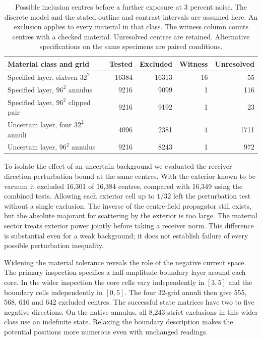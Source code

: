\begin{table}[tb]\centering
\caption{Possible inclusion centres before a further exposure at 3 percent noise. The discrete model and the stated outline and contrast intervals are assumed here. An exclusion applies to every material in that class. The witness column counts centres with a checked material. Unresolved centres are retained. Alternative specifications on the same specimens are paired conditions.}\label{tab:cover}
\small\begin{tabular}{@{}lrrrr@{}}\toprule
Material class and grid & Tested & Excluded & Witness & Unresolved\\\midrule
Specified layer, sixteen $32^2$ & 16384 & 16313 & 16 & 55\\
Specified layer, $96^2$ annulus & 9216 & 9099 & 1 & 116\\
Specified layer, $96^2$ clipped pair & 9216 & 9192 & 1 & 23\\
Uncertain layer, four $32^2$ annuli & 4096 & 2381 & 4 & 1711\\
Uncertain layer, $96^2$ annulus & 9216 & 8243 & 1 & 972\\\bottomrule
\end{tabular}\end{table}

To isolate the effect of an uncertain background we evaluated the receiver-direction perturbation bound at the same centres. With the exterior known to be vacuum it excluded 16,301 of 16,384 centres, compared with 16,349 using the combined tests. Allowing each exterior cell up to $1/32$ left the perturbation test without a single exclusion. The inverse of the centre-field propagator still exists, but the absolute majorant for scattering by the exterior is too large. The material sector treats exterior power jointly before taking a receiver norm. This difference is substantial even for a weak background; it does not establish failure of every possible perturbation inequality.

Widening the material tolerance reveals the role of the negative current space. The primary inspection specifies a half-amplitude boundary layer around each core. In the wider inspection the core cells vary independently in $[3,5]$ and the boundary cells independently in $[0,5]$. The four 32-grid annuli then give 555, 568, 616 and 642 excluded centres. The successful state matrices have two to five negative directions. On the native annulus, all 8,243 strict exclusions in this wider class use an indefinite state. Relaxing the boundary description makes the potential positions more numerous even with unchanged readings.


